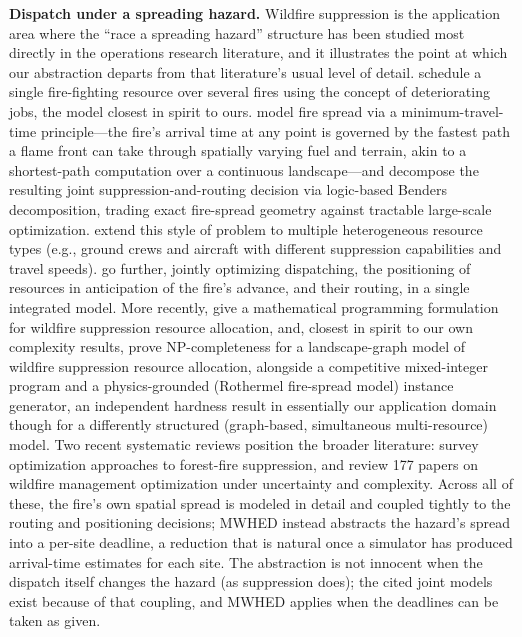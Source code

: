 \documentclass[pdflatex,sn-mathphys-ay]{sn-jnl}
\theoremstyle{thmstyleone}
\theoremstyle{thmstyletwo}
\theoremstyle{thmstylethree}
\begin{document}
\textbf{Dispatch under a spreading hazard.} Wildfire suppression is the
application area where the ``race a spreading hazard'' structure has been
studied most directly in the operations research literature, and it
illustrates the point at which our abstraction departs from that
literature's usual level of detail. \citet{rachaniotis2006} schedule a
single fire-fighting resource over several fires using the concept of
deteriorating jobs, the model closest in spirit to ours.
\citet{harris2023} model fire spread via a minimum-travel-time
principle---the fire's arrival time at any point is governed by the
fastest path a flame front can take through spatially varying
fuel and terrain, akin to a shortest-path computation over a
continuous landscape---and decompose the resulting joint
suppression-and-routing decision via logic-based Benders decomposition,
trading exact fire-spread geometry against tractable large-scale
optimization. \citet{avci2024} extend this style of problem to multiple
heterogeneous resource types (e.g., ground crews and aircraft with
different suppression capabilities and travel speeds).
\citet{alvelos2025} go further, jointly optimizing dispatching, the
positioning of resources in anticipation of the fire's advance, and
their routing, in a single integrated model. More recently,
\citet{granda2025} give a mathematical programming formulation for
wildfire suppression resource allocation, and, closest in spirit to our
own complexity results, \citet{delazeri2026} prove NP-completeness for a
landscape-graph model of wildfire suppression resource allocation,
alongside a competitive mixed-integer program and a physics-grounded
(Rothermel fire-spread model) instance generator, an independent hardness
result in essentially our application domain though for a differently
structured (graph-based, simultaneous multi-resource) model. Two recent
systematic reviews position the broader literature: \citet{tezcan2025}
survey optimization approaches to forest-fire suppression, and
\citet{rostamian2026} review 177 papers on wildfire management
optimization under uncertainty and complexity. Across all of these, the
fire's own spatial spread is modeled in detail and coupled tightly to the
routing and positioning decisions; MWHED instead abstracts the hazard's
spread into a per-site deadline, a reduction that is natural once a
simulator has produced arrival-time estimates for each site. The
abstraction is not innocent when the dispatch itself changes the hazard
(as suppression does); the cited joint models exist because of that
coupling, and MWHED applies when the deadlines can be taken as given.
\end{document}
